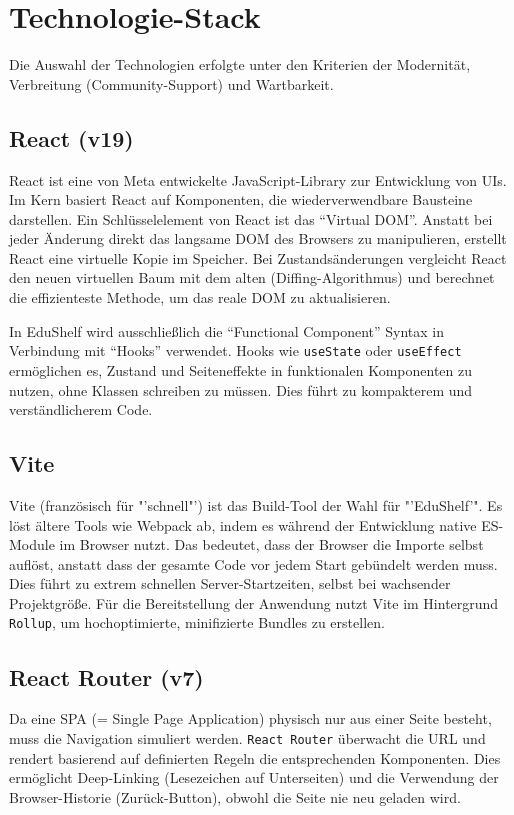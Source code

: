 \section{Technologie-Stack}
Die Auswahl der Technologien erfolgte unter den Kriterien der Modernität, Verbreitung (Community-Support) und Wartbarkeit.

\subsection{React (v19)}
React ist eine von Meta entwickelte JavaScript-Library zur Entwicklung von UIs. Im Kern basiert React auf Komponenten, die wiederverwendbare Bausteine darstellen.
Ein Schlüsselelement von React ist das "`Virtual DOM"'. Anstatt bei jeder Änderung direkt das langsame DOM des Browsers zu manipulieren, erstellt React eine virtuelle Kopie im Speicher. Bei Zustandsänderungen vergleicht React den neuen virtuellen Baum mit dem alten (Diffing-Algorithmus) und berechnet die effizienteste Methode, um das reale DOM zu aktualisieren.

In EduShelf wird ausschließlich die "`Functional Component"' Syntax in Verbindung mit "`Hooks"' verwendet. Hooks wie \texttt{useState} oder \texttt{useEffect} ermöglichen es, Zustand und Seiteneffekte in funktionalen Komponenten zu nutzen, ohne Klassen schreiben zu müssen. Dies führt zu kompakterem und verständlicherem Code.

\subsection{Vite}
Vite (französisch für "'schnell"') ist das Build-Tool der Wahl für "'EduShelf'". Es löst ältere Tools wie Webpack ab, indem es während der Entwicklung native ES-Module im Browser nutzt. Das bedeutet, dass der Browser die Importe selbst auflöst, anstatt dass der gesamte Code vor jedem Start gebündelt werden muss. Dies führt zu extrem schnellen Server-Startzeiten, selbst bei wachsender Projektgröße.
Für die Bereitstellung der Anwendung nutzt Vite im Hintergrund \texttt{Rollup}, um hochoptimierte, minifizierte Bundles zu erstellen.

\subsection{React Router (v7)}
Da eine SPA (= Single Page Application) physisch nur aus einer Seite besteht, muss die Navigation simuliert werden. \texttt{React Router} überwacht die URL und rendert basierend auf definierten Regeln die entsprechenden Komponenten. Dies ermöglicht Deep-Linking (Lesezeichen auf Unterseiten) und die Verwendung der Browser-Historie (Zurück-Button), obwohl die Seite nie neu geladen wird.

